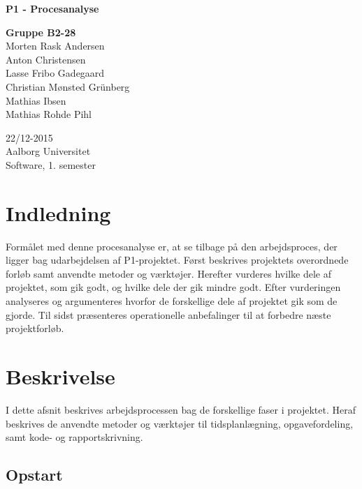 \documentclass[oneside,a4paper,titlepage]{article}
\begin{document}
\begin{titlepage}
  \vspace{0.2cm}
  \begin{center}
    \Huge{\textbf{P1 - Procesanalyse}}
  \end{center}
  \vspace{0.2cm}
  \begin{center}
    \Large{\textbf{Gruppe B2-28}}\\
    Morten Rask Andersen\\
    Anton Christensen\\
    Lasse Fribo Gadegaard\\
    Christian Mønsted Grünberg\\
    Mathias Ibsen\\
    Mathias Rohde Pihl
  \end{center}
  \begin{center}
    22/12-2015\\
    Aalborg Universitet\\
    Software, 1. semester
  \end{center}
\end{titlepage}





\section{Indledning}

Formålet med denne procesanalyse er, at se tilbage på den arbejdsproces, der ligger bag udarbejdelsen af P1-projektet. Først beskrives projektets overordnede forløb samt anvendte metoder og værktøjer. Herefter vurderes hvilke dele af projektet, som gik godt, og hvilke dele der gik mindre godt. Efter vurderingen analyseres og argumenteres hvorfor de forskellige dele af projektet gik som de gjorde. Til sidst præsenteres operationelle anbefalinger til at forbedre næste projektforløb. 

\section{Beskrivelse}
\label{sec:beskrivelse}
I dette afsnit beskrives arbejdsprocessen bag de forskellige faser i projektet. Heraf beskrives de anvendte metoder og værktøjer til tidsplanlægning, opgavefordeling, samt kode- og rapportskrivning.

\subsection{Opstart}
\end{document}
